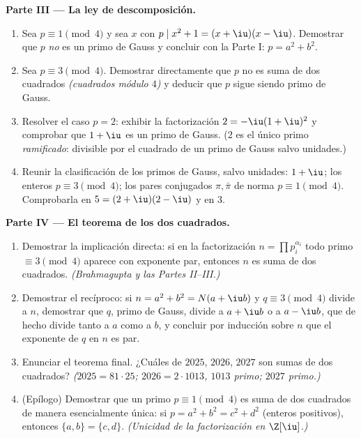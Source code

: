 \begin{problem}
\medskip
\noindent\textbf{Parte III --- La ley de descomposición.}
\begin{enumerate}[resume]
  \item Sea $p \equiv 1 \pmod 4$ y sea $x$ con $p \mid x^2 + 1 =
        (x + \iu)(x - \iu)$. Demostrar que $p$ \emph{no} es un primo de
  Gauss y concluir con la Parte I: $p = a^2 + b^2$. \item Sea
  $p \equiv 3 \pmod 4$. Demostrar directamente que $p$ no es suma de dos
  cuadrados \emph{(cuadrados módulo $4$)} y deducir que $p$ sigue siendo
  primo de Gauss. \item Resolver el caso $p = 2$: exhibir la
  factorización $2 =
        -\iu(1+\iu)^2$ y comprobar que $1 + \iu$ es un primo de Gauss.
  ($2$ es el único primo \emph{ramificado}: divisible por el cuadrado de
  un primo de Gauss salvo unidades.) \item Reunir la clasificación de
  los primos de Gauss, salvo unidades: $1 + \iu$; los enteros
  $p \equiv 3 \pmod 4$; los pares conjugados $\pi, \bar\pi$ de norma
  $p \equiv 1 \pmod
        4$. Comprobarla en $5 = (2+\iu)(2-\iu)$ y en $3$.
\end{enumerate}

\medskip
\noindent\textbf{Parte IV --- El teorema de los dos cuadrados.}
\begin{enumerate}[resume]
  \item Demostrar la implicación directa: si en la factorización $n =
        \prod p_i^{\alpha_i}$ todo primo $\equiv 3 \pmod 4$ aparece con
  exponente par, entonces $n$ es suma de dos cuadrados.
  \emph{(Brahmagupta y las Partes II--III.)} \item Demostrar el
  recíproco: si $n = a^2 + b^2 = N(a + \iu b)$ y $q \equiv 3 \pmod 4$
  divide a $n$, demostrar que $q$, primo de Gauss, divide a $a + \iu b$
  o a $a - \iu b$, que de hecho divide tanto a $a$ como a $b$, y
  concluir por inducción sobre $n$ que el exponente de $q$ en $n$ es
  par. \item Enunciar el teorema final. ¿Cuáles de $2025$, $2026$,
  $2027$ son sumas de dos cuadrados? \emph{($2025 = 81 \cdot 25$;
  $2026 = 2 \cdot 1013$, $1013$ primo; $2027$ primo.)} \item (Epílogo)
  Demostrar que un primo $p \equiv 1 \pmod 4$ es suma de dos cuadrados
  de manera esencialmente única: si $p =
        a^2 + b^2 = c^2 + d^2$ (enteros positivos), entonces $\{a, b\}
        = \{c, d\}$. \emph{(Unicidad de la factorización en
        $\Z[\iu]$.)}
\end{enumerate}


\end{problem}
